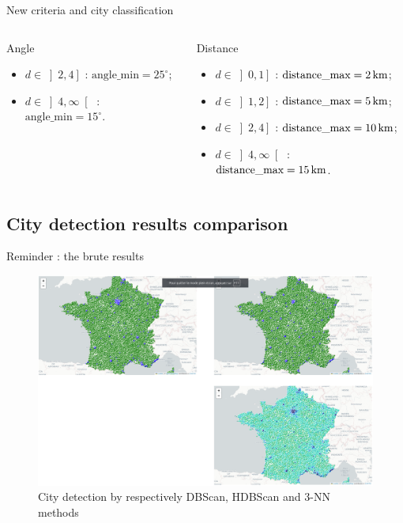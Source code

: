 \begin{frame}{New criteria and city classification}
\begin{columns}
\begin{column}{0.4\paperwidth}
\begin{block}{Angle}
\begin{itemize}
                    \item $d\in\left]2, 4\right]$ : $\text{angle\_min}=25^\circ$;
                    \item $d\in\left]4, \infty\right[$ : $\text{angle\_min}=15^\circ$.
                \end{itemize}
            \end{block}
        \end{column}
        \begin{column}{0.4\paperwidth}
            \begin{block}{Distance}
                \begin{itemize}
                    \item $d\in\left]0, 1\right]$ : $\text{distance\_max}=\unit[2]{km}$;
                    \item $d\in\left]1, 2\right]$ : $\text{distance\_max}=\unit[5]{km}$;
                    \item $d\in\left]2, 4\right]$ : $\text{distance\_max}=\unit[10]{km}$;
                    \item $d\in\left]4, \infty\right[$ : $\text{distance\_max}=\unit[15]{km}$.
                \end{itemize}
            \end{block}
        \end{column}
    \end{columns}
\end{frame}


\subsection{City detection results comparison}
\insertsubsectionframe

\begin{frame}{Reminder : the brute results}
    \begin{figure}
        \includegraphics[height=0.6\paperheight]{images/city-detection.png}
        \caption{\label{fig:city-detection}City detection by respectively DBScan, HDBScan and 3-NN methods}
    \end{figure}
\end{frame}

